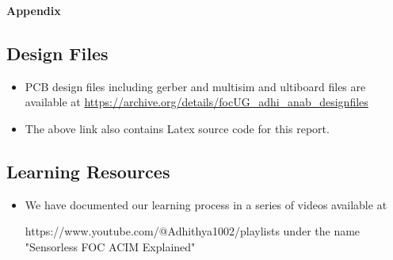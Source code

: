 \newpage

\begin{center}
    \textbf{Appendix}
\end{center}


\subsection*{Design Files}

\begin{itemize}
    \item PCB design files including gerber and multisim and ultiboard files are available at \url{https://archive.org/details/focUG_adhi_anab_designfiles}
    
    \item The above link also contains Latex source code for this report.
\end{itemize}


\subsection*{Learning Resources}


\begin{itemize}
    \item  We have documented our learning process in a series of videos available at 
    
    https://www.youtube.com/@Adhithya1002/playlists under the name "Sensorless FOC ACIM Explained"


\end{itemize}

